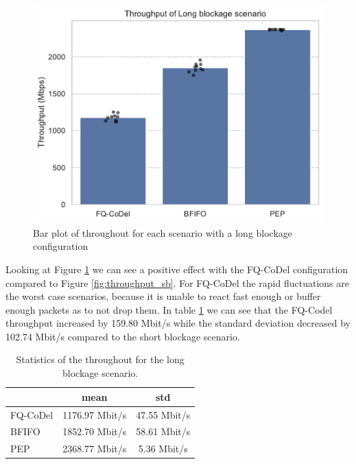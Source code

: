 \documentclass[a4paper,english, 12pt]{report}
\begin{document}
\begin{figure}[!h!] %
	\centering 
	\includegraphics[scale=0.70]{../diagrams/witestlab/throughput/throughput_lb.pdf}
  	\caption{Bar plot of throughout for each scenario with a long blockage configuration}
  	\label{fig:throughput_lb}
\end{figure}

Looking at Figure \ref{fig:throughput_lb} we can see a positive effect with the FQ-CoDel configuration compared to Figure \ref{fig:throughput_sb}. For FQ-CoDel the rapid fluctuations are the worst case scenarios, because it is unable to react fast enough or buffer enough packets as to not drop them. In table \ref{tab:throughput_lb_table} we can see that the FQ-Codel throughput increased by 159.80 Mbit/s while the standard deviation decreased by 102.74 Mbit/s compared to the short blockage scenario.

\begin{table}[h!]
\centering
\begin{tabular}{l|c|c}
\hline
 & \textbf{mean} & \textbf{std} \\ 
\hline
FQ-CoDel & 1176.97 Mbit/s      & 47.55 Mbit/s \\
BFIFO    & 1852.70 Mbit/s      & 58.61 Mbit/s  \\
PEP      & 2368.77 Mbit/s      & 5.36  Mbit/s   \\
\hline
\end{tabular}
\caption{Statistics of the throughout for the long blockage scenario.}
\label{tab:throughput_lb_table}
\end{table}
\end{document}
